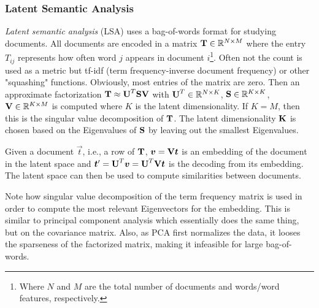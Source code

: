 			\subsubsection{Latent Semantic Analysis}
				\emph{Latent semantic analysis} (LSA) uses a bag-of-words format for studying documents. All documents are encoded in a matrix \( \bm{\mathrm{T}} \in \mathbb{R}^{N \times M} \) where the entry \(T_{ij}\) represents how often word \(j\) appears in document \(i\)\footnote{Where \(N\) and \(M\) are the total number of documents and words/word features, respectively.}. Often not the count is used as a metric but tf-idf (term frequency-inverse document frequency) or other "squashing" functions. Obviously, most entries of the matrix are zero. Then an approximate factorization \( \bm{\mathrm{T}} \approx \bm{\mathrm{U}}^T \bm{\mathrm{S}} \bm{\mathrm{V}} \) with \( \bm{\mathrm{U}}^T \in \mathbb{R}^{N \times K} \), \( \bm{\mathrm{S}} \in \mathbb{R}^{K \times K} \), \( \bm{\mathrm{V}} \in \mathbb{R}^{K \times M} \) is computed where \(K\) is the latent dimensionality. If \(K = M\), then this is the singular value decomposition of \(\bm{\mathrm{T}}\). The latent dimensionality \(\bm{\mathrm{K}}\) is chosen based on the Eigenvalues of \(\bm{\mathrm{S}}\) by leaving out the smallest Eigenvalues.

				Given a document \(\vec{t}\), i.e., a row of \(\bm{\mathrm{T}}\), \( \bm{v} = \bm{\mathrm{V}} \bm{t} \) is an embedding of the document in the latent space and \( \bm{t}' = \bm{\mathrm{U}}^T \bm{v} = \bm{\mathrm{U}}^T \bm{\mathrm{V}} \bm{t} \) is the decoding from its embedding. The latent space can then be used to compute similarities between documents.

				Note how singular value decomposition of the term frequency matrix is used in order to compute the most relevant Eigenvectors for the embedding. This is similar to principal component analysis which essentially does the same thing, but on the covariance matrix. Also, as PCA first normalizes the data, it looses the sparseness of the factorized matrix, making it infeasible for large bag-of-words.

